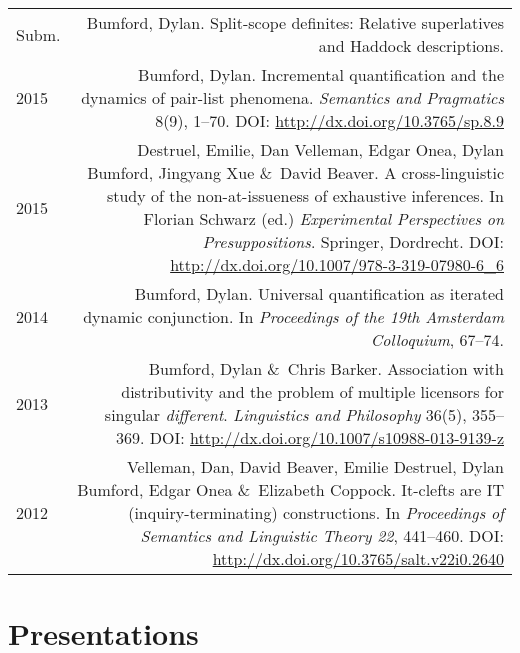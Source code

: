 \documentclass[11pt]{article}
\newcommand{\doi}[1]{\url{http://dx.doi.org/#1}}
\newcommand{\with}{\&}
\begin{document}
\begin{longtable}{LR}
  Subm. & Bumford, Dylan. Split-scope definites: Relative superlatives and
          Haddock descriptions.\\
  2015  & Bumford, Dylan. Incremental quantification and the dynamics of
          pair-list phenomena. \textit{Semantics and Pragmatics} 8(9), 1--70.
          DOI: \doi{10.3765/sp.8.9}\\
  2015  & Destruel, Emilie, Dan Velleman, Edgar Onea, Dylan Bumford, Jingyang Xue
          \with~David Beaver. A cross-linguistic study of the non-at-issueness
          of exhaustive inferences. In Florian Schwarz (ed.)
          \textit{Experimental Perspectives on Presuppositions}. Springer,
          Dordrecht. DOI: \doi{10.1007/978-3-319-07980-6_6}\\
  2014  & Bumford, Dylan. Universal quantification as iterated dynamic
          conjunction. In \textit{Proceedings of the 19th Amsterdam
          Colloquium}, 67--74.\\
  2013  & Bumford, Dylan \with~Chris Barker. Association with distributivity
          and the problem of multiple licensors for singular
          \textit{different}. \textit{Linguistics and Philosophy} 36(5),
          355--369. DOI: \doi{10.1007/s10988-013-9139-z}\\ %
  2012  & Velleman, Dan, David Beaver, Emilie Destruel, Dylan Bumford, Edgar
          Onea \with~Elizabeth Coppock. It-clefts are IT (inquiry-terminating)
          constructions. In \textit{Proceedings of Semantics and Linguistic
          Theory 22}, 441--460. DOI: \doi{10.3765/salt.v22i0.2640}
\end{longtable}


\section*{Presentations}
\end{document}
